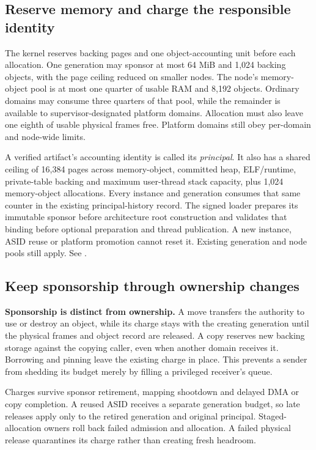 \subsection{Reserve memory and charge the responsible identity}

The kernel reserves backing pages and one object-accounting unit before each
allocation. One generation may sponsor at most 64 MiB and 1,024 backing objects,
with the page ceiling reduced on smaller nodes. The node's memory-object pool
is at most one quarter of usable RAM and 8,192 objects. Ordinary domains may
consume three quarters of that pool, while the remainder is available to
supervisor-designated platform domains. Allocation must also leave one eighth
of usable physical frames free. Platform domains still obey per-domain and
node-wide limits.

A verified artifact's accounting identity is called its \emph{principal}.
It also has a shared ceiling of 16,384 pages across
memory-object, committed heap, ELF/runtime, private-table backing and maximum
user-thread stack capacity, plus 1,024 memory-object allocations. Every instance
and generation consumes that same counter in the existing principal-history
record. The signed loader prepares its immutable sponsor before architecture root
construction and validates that binding before optional preparation and thread
publication. A new instance, ASID reuse or platform promotion cannot reset it.
Existing generation and node pools still apply.
See .

\subsection{Keep sponsorship through ownership changes}

\textbf{Sponsorship is distinct from ownership.} A move transfers the authority
to use or destroy an object, while its charge stays with the creating
generation until the physical frames and object record are released. A copy
reserves new backing storage against the copying caller, even when another
domain receives it. Borrowing and pinning leave the existing charge in place. This
prevents a sender from shedding its budget merely by filling a privileged
receiver's queue.

Charges survive sponsor retirement, mapping shootdown and delayed DMA or copy
completion. A reused ASID receives a separate generation budget, so late releases
apply only to the retired generation and original principal. Staged-allocation
owners roll back failed admission and allocation. A failed physical release
quarantines its charge rather than creating fresh headroom.

